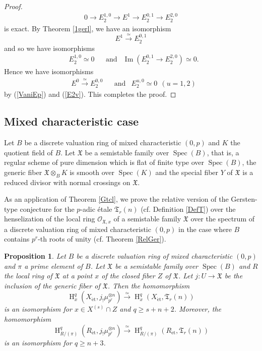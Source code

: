 \documentclass{article}
\newtheorem{prop}[thm]{\indent \sc Proposition}
\newcommand{\spec}{\operatorname{Spec}}
\newcommand{\et}{\mathrm{\acute{e}t}}
\newcommand{\HO}{\operatorname{H}}
\begin{document}
\begin{proof}
%
\begin{align*}
0\to
E^{1, 0}_{2}\to
E^{1}\to
E^{0, 1}_{2}\to
E^{2, 0}_{2}
\end{align*}
%
is exact.
By Theorem \ref{1gerl}, we have an isomorphism
%
\begin{equation*}
E^{1}
\xrightarrow{\simeq}
E^{0, 1}_{2}
\end{equation*}
%
and so we have isomorphisms
%
\begin{align*}
& E^{1, 0}_{2}\simeq 0
&& \textrm{and}
& \operatorname{Im}(E^{0, 1}_{2}\to E^{2, 0}_{2})
\simeq 0.
\end{align*}
%
Hence we have isomorphisms
%
\begin{align*}
& E^{0}\xrightarrow{\simeq}
E^{0, 0}_{2}
&& \textrm{and}
& E^{u, 0}_{2}\simeq 0~~(u=1, 2)
\end{align*}
%
by (\ref{VaniEp}) and (\ref{E2v}). This completes the proof.
\end{proof}
%




\subsection{Mixed characteristic case}
Let $B$ be a discrete valuation ring  of mixed characteristic $(0, p)$ and 
$K$ the quotient field of $B$. Let $\mathfrak{X}$ be a semistable family
over $\spec(B)$, that is, a regular scheme of pure dimension which is flat
of finite type over $\spec(B)$,
the generic fiber 
$\mathfrak{X}\otimes_{B}K$ is smooth over $\spec(K)$
and the special fiber $Y$ of $\mathfrak{X}$ is a reduced divisor with normal
crossings on $\mathfrak{X}$.

As an application of Theorem \ref{Gtcl}, we prove the relative version of the Gersten-type conjecture for
the $p$-adic \'{e}tale $\mathfrak{T}_{r}(n)$ (cf. Definition \ref{DefT}) 
over the henselization of the local ring $\mathcal{O}_{\mathfrak{X}, x}$
of a semistable family $\mathfrak{X}$ over the spectrum of a discrete valuation ring
of mixed characteristic $(0, p)$
in the case where
$B$ contains $p^{r}$-th roots of unity
(cf. Theorem \ref{RelGer}).  

%
\begin{prop}\upshape\label{jtxiso}
Let $B$ be a discrete valuation ring of mixed characteristic $(0, p)$
and $\pi$ a prime element of $B$. Let $\mathfrak{X}$ be a semistable
family over $\spec(B)$ and $R$ the local ring of $\mathfrak{X}$ at a 
point $x$ of the closed fiber $Z$ of $\mathfrak{X}$.
Let $j: U\to \mathfrak{X}$ be the inclusion of
the generic fiber of $\mathfrak{X}$.
Then the homomorphism
%
\begin{equation*}
\HO^{q}_{x}(X_{\et}, j_{!}\mu_{p^{r}}^{\otimes n})
\xrightarrow{\simeq}
\HO^{q}_{x}(X_{\et}, \mathfrak{T}_{r}(n))
\end{equation*}
%
is an isomorphism
for $x\in X^{(s)}\cap Z$ and $q\geq s+n+2$.
Moreover,
the homomorphism
%
\begin{equation*}
\HO^{q}_{R/(\pi)}(R_{\et}, j_{!}\mu_{p^{r}}^{\otimes n})
\xrightarrow{\simeq}
\HO^{q}_{R/(\pi)}(R_{\et}, \mathfrak{T}_{r}(n))
\end{equation*}
%
is an isomorphism for $q\geq n+3$.
\end{prop}
%
\end{document}
